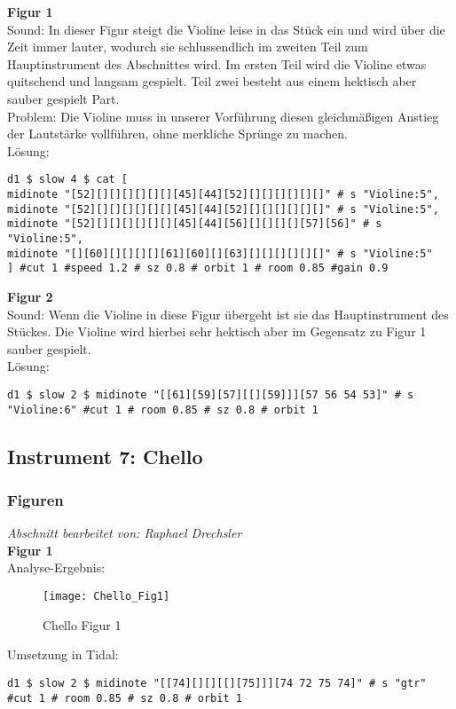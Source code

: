 \documentclass[
10pt, %
a4paper, %
oneside, %
headinclude,footinclude, %
BCOR5mm, %
]{scrartcl}
\begin{document}
\noindent\textbf{Figur 1}\\
Sound: In dieser Figur steigt die Violine leise in das Stück ein und wird über die Zeit immer lauter, wodurch sie schlussendlich im zweiten Teil 
zum Hauptinstrument des Abschnittes wird. Im ersten Teil wird die Violine etwas quitschend und langsam gespielt. Teil zwei besteht aus einem hektisch aber sauber gespielt Part.\\
Problem: Die Violine muss in unserer Vorführung diesen gleichmäßigen Anstieg der Lautstärke vollführen, ohne merkliche Sprünge zu machen.\\
Lösung:
\begin{lstlisting}
d1 $ slow 4 $ cat [
midinote "[52][][][][][][][45][44][52][][][][][][]" # s "Violine:5",
midinote "[52][][][][][][][45][44][52][][][][][][]" # s "Violine:5",
midinote "[52][][][][][][][45][44][56][][][][][57][56]" # s "Violine:5",
midinote "[][60][][][][][61][60][][63][][][][][][]" # s "Violine:5"
] #cut 1 #speed 1.2 # sz 0.8 # orbit 1 # room 0.85 #gain 0.9
\end{lstlisting}
\noindent\textbf{Figur 2}\\
Sound: Wenn die Violine in diese Figur übergeht ist sie das Hauptinstrument des Stückes. Die Violine wird hierbei sehr hektisch aber im Gegensatz zu Figur 1 sauber gespielt.\\
Lösung:
\begin{lstlisting}
d1 $ slow 2 $ midinote "[[61][59][57][[][59]]][57 56 54 53]" # s "Violine:6" #cut 1 # room 0.85 # sz 0.8 # orbit 1
\end{lstlisting}



\subsection{Instrument 7: Chello}
\subsubsection{Figuren}
\textit{Abschnitt bearbeitet von: Raphael Drechsler}\\

\noindent\textbf{Figur 1}\\
Analyse-Ergebnis:
\begin{figure}[h]
	\centering 
	\texttt{[image: Chello\_Fig1]} 
	\caption{Chello Figur 1}
\end{figure}

\noindent Umsetzung in Tidal:
\begin{lstlisting}
d1 $ slow 2 $ midinote "[[74][][][[][75]]][74 72 75 74]" # s "gtr" #cut 1 # room 0.85 # sz 0.8 # orbit 1
\end{lstlisting}
\end{document}
